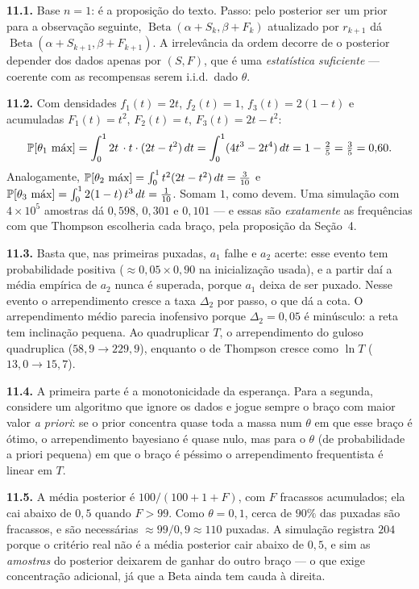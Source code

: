 \documentclass[11pt, a4paper]{article}
\newcommand{\Bdist}{\operatorname{Beta}}
\begin{document}
\textbf{11.1.} Base $n=1$: é a proposição do texto. Passo: pelo posterior ser um
prior para a observação seguinte, $\Bdist(\alpha+S_k,\beta+F_k)$ atualizado por
$r_{k+1}$ dá $\Bdist(\alpha+S_{k+1},\beta+F_{k+1})$. A irrelevância da ordem
decorre de o posterior depender dos dados apenas por $(S,F)$, que é uma
\emph{estatística suficiente} — coerente com as recompensas serem i.i.d.\ dado
$\theta$.

\medskip
\textbf{11.2.} Com densidades $f_1(t) = 2t$, $f_2(t) = 1$, $f_3(t) = 2(1-t)$ e
acumuladas $F_1(t)=t^2$, $F_2(t)=t$, $F_3(t)=2t-t^2$:
\[
  \mathbb{P}[\theta_1 \text{ máx}] = \int_0^1 2t\,\cdot t \cdot (2t-t^2)\,dt
  = \int_0^1 (4t^3 - 2t^4)\,dt = 1 - \tfrac{2}{5} = \tfrac{3}{5} = 0{,}60 .
\]
Analogamente,
$\mathbb{P}[\theta_2 \text{ máx}] = \int_0^1 t^2(2t-t^2)\,dt = \tfrac{3}{10}$ e
$\mathbb{P}[\theta_3 \text{ máx}] = \int_0^1 2(1-t)\,t^3\,dt = \tfrac{1}{10}$.
Somam $1$, como devem. Uma simulação com $4\times10^5$ amostras dá $0{,}598$,
$0{,}301$ e $0{,}101$ — e essas são \emph{exatamente} as frequências com que
Thompson escolheria cada braço, pela proposição da Seção~4.

\medskip
\textbf{11.3.} Basta que, nas primeiras puxadas, $a_1$ falhe e $a_2$ acerte:
esse evento tem probabilidade positiva ($\approx 0{,}05 \times 0{,}90$ na
inicialização usada), e a partir daí a média empírica de $a_2$ nunca é superada,
porque $a_1$ deixa de ser puxado. Nesse evento o arrependimento cresce a taxa
$\Delta_2$ por passo, o que dá a cota. O arrependimento médio parecia inofensivo
porque $\Delta_2 = 0{,}05$ é minúsculo: a reta tem inclinação pequena. Ao
quadruplicar $T$, o arrependimento do guloso quadruplica ($58{,}9 \to 229{,}9$),
enquanto o de Thompson cresce como $\ln T$ ($13{,}0 \to 15{,}7$).

\medskip
\textbf{11.4.} A primeira parte é a monotonicidade da esperança. Para a segunda,
considere um algoritmo que ignore os dados e jogue sempre o braço com maior
valor \emph{a priori}: se o prior concentra quase toda a massa num $\theta$ em
que esse braço é ótimo, o arrependimento bayesiano é quase nulo, mas para o
$\theta$ (de probabilidade a priori pequena) em que o braço é péssimo o
arrependimento frequentista é linear em $T$.

\medskip
\textbf{11.5.} A média posterior é $100/(100+1+F)$, com $F$ fracassos
acumulados; ela cai abaixo de $0{,}5$ quando $F > 99$. Como $\theta = 0{,}1$,
cerca de $90\%$ das puxadas são fracassos, e são necessárias
$\approx 99/0{,}9 \approx 110$ puxadas. A simulação registra $204$ porque o
critério real não é a média posterior cair abaixo de $0{,}5$, e sim as
\emph{amostras} do posterior deixarem de ganhar do outro braço — o que exige
concentração adicional, já que a Beta ainda tem cauda à direita.
\end{document}
